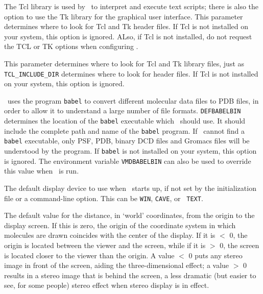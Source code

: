 \begin{itemize}
The Tcl library is used by \VMD\ to interpret and execute text scripts; there is also the option to use the Tk library for the graphical user interface.  This parameter determines where to look for Tcl and Tk header files.  If Tcl  is not installed on your system, this option is ignored.  ALso, if Tcl is not installed, do not request the TCL or TK options when configuring \VMD.

This parameter determines where to look for Tcl and Tk library files, just as {\tt TCL\_INCLUDE\_DIR} determines where to look for header files.  If Tcl  is not installed on your system, this option is ignored.

\VMD\ uses the program {\tt babel} to convert different molecular data files to PDB files, in order to allow it to understand a large number of file formats.  {\tt DEFBABELBIN} determines the location of the {\tt babel} executable which \VMD\ should use.  It should include the complete path and name of the {\tt babel} program.  If \VMD\ cannot find a {\tt babel} executable, only PSF, PDB, binary DCD files and Gromacs files will be understood by the program.  If {\tt babel} is not installed on your system, this option is ignored.  The environment variable {\tt VMDBABELBIN} can also be used to override this value when \VMD\ is run.

The default display device to use
when \VMD\ starts up, if not set by the initialization file or a
command-line option.  This can be {\tt WIN}, {\tt CAVE}, or {\tt
TEXT}.

The default value for the distance, in `world' coordinates, from the origin to
the display screen.  If this is zero, the origin of the coordinate system in
which molecules are drawn coincides with the center of the display.  If it is
$<$ 0, the origin is located between the viewer and the screen, while if it
is $>$ 0, the screen is located closer to the viewer than the origin.  A value
$<$ 0 puts any stereo image in front of the screen, aiding the three-dimensional
effect; a value $>$ 0 results in a stereo image that is behind the screen, a
less dramatic (but easier to see, for some people) stereo effect when stereo
display is in effect.


\end{itemize}
